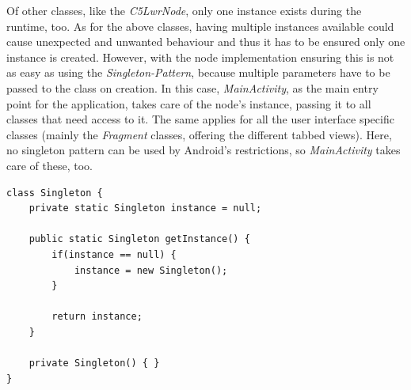 Of other classes, like the \textit{C5LwrNode}, only one instance exists during the runtime, too. As for the above classes, having multiple instances available could cause unexpected and unwanted behaviour and thus it has to be ensured only one instance is created. However, with the node implementation ensuring this is not as easy as using the \textit{Singleton-Pattern}, because multiple parameters have to be passed to the class on creation. In this case, \textit{MainActivity}, as the main entry point for the application, takes care of the node's instance, passing it to all classes that need access to it. The same applies for all the user interface specific classes (mainly the \textit{Fragment} classes, offering the different tabbed views). Here, no singleton pattern can be used by Android's restrictions, so \textit{MainActivity} takes care of these, too.

\begin{minipage}{\linewidth}
\begin{lstlisting}[caption={Example implementation of the Observer-Pattern}, label=lst:conc:obs]
class Singleton {
	private static Singleton instance = null;

	public static Singleton getInstance() {
		if(instance == null) {
			instance = new Singleton();
		}
		
		return instance;
	}
	
	private Singleton() { }
}
\end{lstlisting}
\end{minipage}
